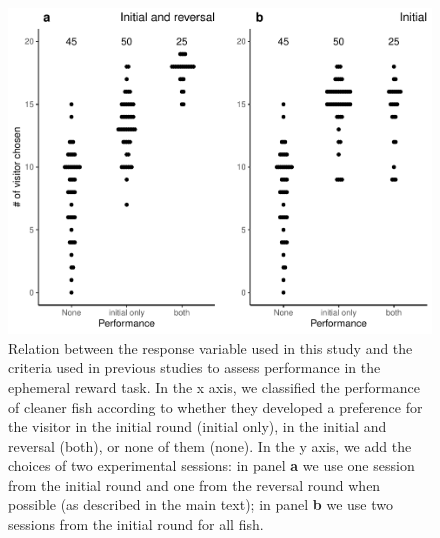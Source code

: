 \documentclass[
  12pt,
]{article}
\begin{document}
\begin{figure}
\includegraphics[width=1\linewidth]{manuscript_BE_files/figure-latex/rawdata-1} \caption{Relation between the response variable used in this study and the criteria used in previous studies to assess performance in the ephemeral reward task. In the x axis, we classified the performance of cleaner fish according to whether they developed a preference for the visitor in the initial round (initial only), in the initial and reversal (both), or none of them (none). In the y axis, we add the choices of two experimental sessions: in panel \textbf{a} we use one session from the initial round and one from the reversal round when possible (as described in the main text); in panel \textbf{b} we use two sessions from the initial round for all fish.}\label{fig:rawdata}
\end{figure}
\end{document}
